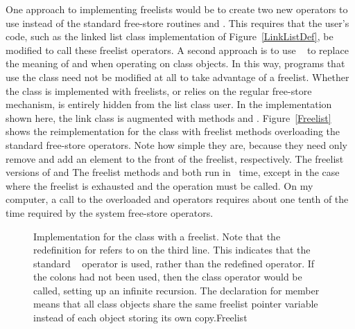 {One approach to implementing freelists would be to create two new
operators to use instead of the standard free-store routines
 and .
This requires that the user's code, such as the linked list class
implementation of Figure~\ref{LinkListDef}, be modified to call
these freelist operators.
A second approach is to use
\Lang\ 
to replace the meaning of
 and  when operating on  class
objects.
In this way, programs that use the  class need not be
modified at all to take advantage of a freelist.
Whether the  class is implemented with free\-lists, or
relies on the regular free-store mechanism, is entirely hidden from
the list class user.}{}
{In the implementation shown here, the link class is augmented with
methods  and .}{}
Figure~\ref{Freelist} shows the reimplementation for the 
class
{with freelist methods overloading the standard free-store operators.}{}
Note how simple they are, because they need only remove and add an
element to the front of the freelist, respectively.
{The freelist versions of  and }{}
{The freelist methods  and }{}
both run in
\Thetaone\ time, except in the case where the freelist is exhausted
and the  operation must be called.
{On my computer, a call to the overloaded  and 
operators requires about one tenth of the time required by the system
free-store operators.}{}

\begin{figure}


{Implementation for the  class with a freelist.
{Note that the redefinition for  refers to  on
the third line.
This indicates that the standard \Lang\  operator is used,
rather than the redefined  operator.
If the colons had not been used, then the  class 
operator would be called, setting up an infinite
recursion.}{}
The  declaration for member  means that
all  class objects share the same freelist pointer variable
instead of each object storing its own copy.}{Freelist}
\vspace{\bigskipamount}
\end{figure}

